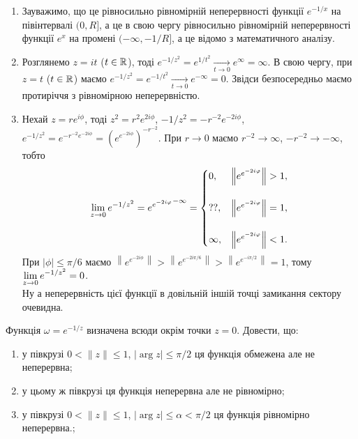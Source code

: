 \begin{solution}
    \begin{enumerate}
        \item Зауважимо, що це рівносильно рівномірній неперервності функції $e^{-1 / x}$ на півінтервалі $(0, R]$, а це в свою чергу рівносильно рівномірній неперервності функції $e^x$ на промені $(- \infty, - 1 / R]$, а це відомо з математичного аналізу.

        \item Розглянемо $z = it$ ($t \in \mathbb{R}$), тоді $e^{-1 / z^2} = e^{1 / t^2} \xrightarrow[t \to 0]{} e^{\infty} = \infty$. В свою чергу, при $z = t$ ($t \in \mathbb{R}$) маємо $e^{-1 / z^2} = e^{-1 / t^2} \xrightarrow[t \to 0]{} e^{-\infty} = 0$. Звідси безпосередньо маємо протиріччя з рівномірною неперервністю.
        
        \item Нехай $z = r e^{i \phi}$, тоді $z^2 = r^2 e^{2 i \phi}$, $-1 / z^2 = - r^{-2} e^{-2 i \phi}$, $e^{-1 / z^2} = e^{- r^{-2} e^{-2 i \phi}} = 
        \left(e^{e^{-2 i \phi}}\right)^{-r^{-2}}$. При $r \to 0$ маємо $r^{-2} \to \infty$, $- r^{-2} \to - \infty$, тобто 
        \[ \displaystyle\lim\limits_{z \to 0} e^{-1 / z^2} = {e^{e^{-2 i \varphi}}}^{-\infty} = \begin{cases} 0, & \left\|e^{e^{-2 i \varphi}}\right\| > 1, \\ \\ ??, & \left\|e^{e^{-2 i \varphi}}\right\| = 1, \\ \\ \infty, & \left\|{e^{e^{-2 i \varphi}}}\right\| < 1. \end{cases}\] 
        При $|\phi| \le \pi / 6$ маємо $\left\|e^{e^{-2 i \phi}}\right\| > \left\|e^{e^{-2 i \pi / 6}}\right\| > \left\|e^{e^{-i \pi / 2}}\right\| = 1$, тому $\displaystyle\lim\limits_{z \to 0} e^{-1/z^2} = 0$. \\
        
        Ну а неперервність цієї функції в довільній іншій точці замикання сектору очевидна.
    \end{enumerate}    
\end{solution}

\begin{problem}[Волковиський, 129]
    Функція $\omega = e^{-1 / z}$ визначена всюди окрім точки $z = 0$. Довести, що:
    \begin{enumerate}
        \item у півкрузі $0 < \|z\| \le 1$, $|\arg z| \le \pi / 2$ ця функція обмежена але не неперервна;
        \item у цьому ж півкрузі ця функція неперервна але не рівномірно;
        \item у півкрузі $0 < \|z\| \le 1$, $|\arg z| \le \alpha < \pi /2$ ця функція рівномірно неперервна.;
    \end{enumerate}
\end{problem}

